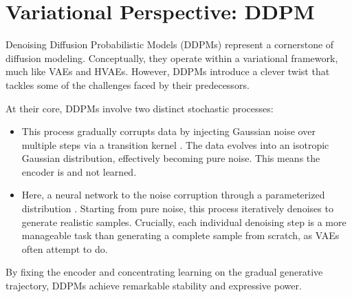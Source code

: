 
\clearpage
\newpage

\section{Variational Perspective: DDPM}\label{sec:ddpm}

Denoising Diffusion Probabilistic Models (DDPMs) \citep{sohl2015deep,ho2020denoising} represent a cornerstone of diffusion modeling. Conceptually, they operate within a variational framework, much like VAEs and HVAEs. However, DDPMs introduce a clever twist that tackles some of the challenges faced by their predecessors.

At their core, DDPMs involve two distinct stochastic processes:
\begin{itemize}
    \item {} This process gradually corrupts data by injecting Gaussian noise over multiple steps via a transition kernel . The data evolves into an isotropic Gaussian distribution, effectively becoming pure noise. This means the encoder is  and not learned.
    \item {} Here, a neural network  to  the noise corruption through a parameterized distribution . Starting from pure noise, this process iteratively denoises to generate realistic samples. Crucially, each individual denoising step is a more manageable task than generating a complete sample from scratch, as VAEs often attempt to do.
\end{itemize}
By fixing the encoder and concentrating learning on the gradual generative trajectory, DDPMs achieve remarkable stability and expressive power. 

